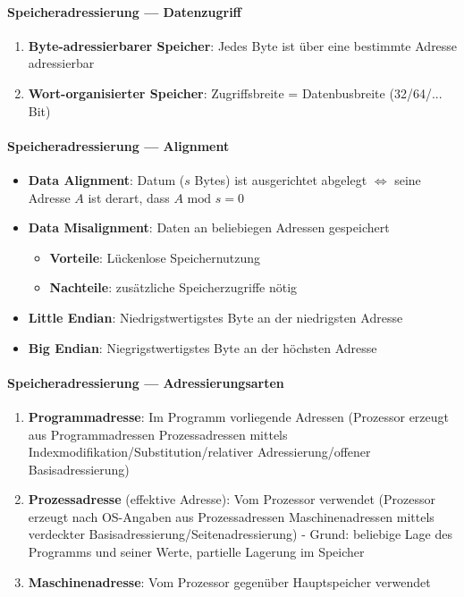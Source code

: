 \paragraph{Speicheradressierung --- Datenzugriff}
\begin{enumerate}
	\item \textbf{Byte-adressierbarer Speicher}: Jedes Byte ist über eine bestimmte Adresse adressierbar
	\item \textbf{Wort-organisierter Speicher}: Zugriffsbreite = Datenbusbreite (32/64/... Bit)
\end{enumerate}

\paragraph{Speicheradressierung --- Alignment}
\begin{itemize}
	\item \textbf{Data Alignment}: Datum ($s$ Bytes) ist ausgerichtet abgelegt $\Leftrightarrow$ seine Adresse $A$ ist derart, dass $A \text{ mod } s = 0$
	\item \textbf{Data Misalignment}: Daten an beliebiegen Adressen gespeichert
	\begin{itemize}
		\item \textbf{Vorteile}: Lückenlose Speichernutzung
		\item \textbf{Nachteile}: zusätzliche Speicherzugriffe nötig
	\end{itemize}
	\item \textbf{Little Endian}: Niedrigstwertigstes Byte an der niedrigsten Adresse
	\item \textbf{Big Endian}: Niegrigstwertigstes Byte an der höchsten Adresse
\end{itemize}

\paragraph{Speicheradressierung --- Adressierungsarten}
\begin{enumerate}
	\item \textbf{Programmadresse}: Im Programm vorliegende Adressen (Prozessor erzeugt aus Programmadressen Prozessadressen mittels Indexmodifikation/Substitution/relativer Adressierung/offener Basisadressierung)
	\item \textbf{Prozessadresse} (effektive Adresse): Vom Prozessor verwendet (Prozessor erzeugt nach OS-Angaben aus Prozessadressen Maschinenadressen mittels verdeckter Basisadressierung/Seitenadressierung) - Grund: beliebige Lage des Programms und seiner Werte, partielle Lagerung im Speicher 
	\item \textbf{Maschinenadresse}: Vom Prozessor gegenüber Hauptspeicher verwendet
\end{enumerate}


